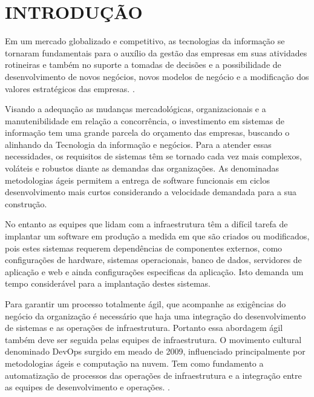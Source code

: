 \chapter{INTRODUÇÃO}

Em um mercado globalizado e competitivo, as tecnologias da informação se tornaram fundamentais para o auxílio da gestão das empresas em suas atividades rotineiras e também no suporte a tomadas de decisões e a possibilidade de desenvolvimento de novos negócios, novos modelos de negócio e a modificação dos valores estratégicos das empresas. \cite{audy}.

Visando a adequação as mudanças mercadológicas, organizacionais e a manutenibilidade em relação a concorrência, o investimento em sistemas de informação tem uma grande parcela do orçamento das empresas, buscando o alinhando da Tecnologia da informação e negócios. \cite{luftman}  
Para a atender essas necessidades, os requisitos de sistemas têm se tornado cada vez mais complexos, voláteis e robustos diante as demandas das organizações. 
As denominadas metodologias ágeis permitem a entrega de software funcionais em ciclos desenvolvimento mais curtos considerando a velocidade demandada para a sua construção. \cite{sbbrocco} 
          
No entanto as equipes que lidam com a infraestrutura têm a difícil tarefa de implantar um software em produção a medida em que são criados ou modificados, pois estes sistemas requerem dependências de componentes externos, como configurações de hardware, sistemas operacionais, banco de dados, servidores de aplicação e web e ainda configurações especificas da aplicação. Isto demanda um tempo considerável para a implantação destes sistemas.

Para garantir um processo totalmente ágil, que acompanhe as exigências do negócio da organização é necessário que haja uma integração do desenvolvimento de sistemas e as operações de infraestrutura. Portanto essa abordagem ágil também deve ser seguida pelas equipes de infraestrutura.
O movimento cultural denominado DevOps surgido em meado de 2009, influenciado principalmente por metodologias ágeis e computação na nuvem. Tem como fundamento a automatização de processos das operações de infraestrutura e a integração entre as equipes de desenvolvimento e operações. \cite{sato}.


